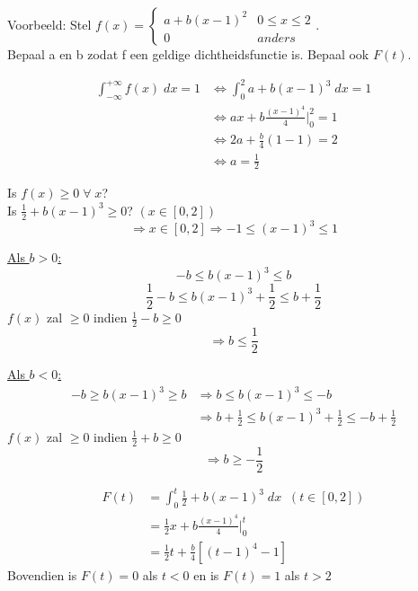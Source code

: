 \documentclass[12pt]{report}
\newcommand{\example}[2]{
      \hrulefill
      
      Voorbeeld: #1
      
      #2
      
      \hrulefill
  }
\begin{document}
\example{Stel $f(x) = 
	\begin{cases} 
		a + b(x - 1)^2  & 0 \leq x \leq 2
		               \\ 0 &  anders 
		
	\end{cases}$.\\ 
	Bepaal a en b zodat f een geldige dichtheidsfunctie is. Bepaal ook $F(t)$.}{
	
	\begin{equation*}
		\begin{split}
			\int_{-\infty}^{+\infty} f(x)\; dx = 1 
			& \Leftrightarrow \int_{0}^{2} a + b(x - 1)^3 \; dx = 1 \\
			& \Leftrightarrow ax + b\frac{(x - 1)^4}{4}\bigg|_{0}^{2} = 1 \\
			& \Leftrightarrow 2a + \frac{b}{4}(1 - 1) = 2 \\
			& \Leftrightarrow a = \frac{1}{2}
		\end{split}
	\end{equation*}
	
	Is $f(x) \geq 0\;\forall\;x$?
	\\
	Is $\frac{1}{2} + b(x - 1)^3 \geq 0$? $(x \in [0, 2])$
	$$\Rightarrow x \in [0, 2] \Rightarrow -1 \leq (x - 1)^3 \leq 1$$
	
	\underline{Als $b > 0$:}
	$$- b \leq b(x-1)^3 \leq b$$
	$$\frac{1}{2} - b \leq b(x-1)^3 + \frac{1}{2} \leq b + \frac{1}{2}$$
	$f(x)$ zal $\geq 0$ indien $\frac{1}{2} - b \geq 0$
	$$\Rightarrow b \leq \frac{1}{2}$$
	
	\underline{Als $b < 0$:}
	\begin{equation*}
		\begin{split}
			- b \geq b(x-1)^3 \geq b & \Rightarrow b \leq b(x-1)^3 \leq -b \\
			& \Rightarrow b + \frac{1}{2} \leq b(x-1)^3+ \frac{1}{2}  \leq -b + \frac{1}{2}
		\end{split}
	\end{equation*}
	$f(x)$ zal $\geq 0$ indien $\frac{1}{2} + b \geq 0$
	$$\Rightarrow b \geq -\frac{1}{2}$$
	
	\begin{equation*}
	 \begin{split}
	  F(t) & = \int_{0}^{t} \frac{1}{2} + b(x - 1)^3\; dx \;\; (t \in [0, 2])\\
	       & = \frac{1}{2}x + b\frac{(x-1)^4}{4}\bigg|_{0}^{t} \\
	       & = \frac{1}{2}t + \frac{b}{4}[(t-1)^4 - 1]
	 \end{split}
	\end{equation*}
	Bovendien is $F(t) = 0$ als $t < 0$ en is $F(t) = 1$ als $t > 2$
	
}
\end{document}

